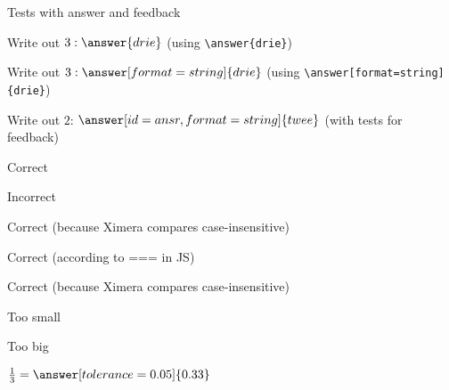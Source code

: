 \documentclass{ximera}
\begin{document}
    \begin{exercise} Tests with answer and feedback

        \begin{question}Write out $3: \answer{drie}$  (using \verb|\answer{drie}|)
        \end{question}

        \begin{question}Write out $3: \answer[format=string]{drie}$ (using \verb|\answer[format=string]{drie}|)
        \end{question}

        \begin{question}Write out $2$: $\answer[id=ansr,format=string]{twee}$ (with tests for feedback)
            \begin{feedback}[correct]{Correct}\end{feedback}
            \begin{feedback}[incorrect]{Incorrect}\end{feedback}    %
            \begin{feedback}[ansr.toLowerCase() === 'twee']{Correct (because Ximera compares case-insensitive)}\end{feedback}  %
            \begin{feedback}[ansr === 'twee']{Correct (according to === in JS)}\end{feedback}  %
            {
            \begin{feedback}[]{Correct (because Ximera compares case-insensitive) }\end{feedback}   %
            }
            \begin{feedback}{Too small}\end{feedback} %
            \begin{feedback}{Too big}\end{feedback}
        \end{question}

        \begin{question}
            $\frac{1}{3} =  \answer[tolerance=0.05]{0.33}$  


\end{question}
\end{exercise}
\end{document}
